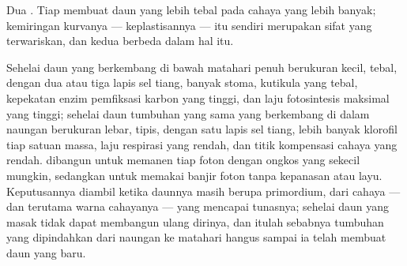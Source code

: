\begin{omfigure}

{\small Dua . Tiap  membuat daun yang lebih tebal
pada cahaya yang lebih banyak; kemiringan kurvanya --- keplastisannya
--- itu sendiri merupakan sifat yang terwariskan, dan kedua 
berbeda dalam hal itu.}
\end{omfigure}

\begin{proposition}\label{prop:b2:plant-plasticity:sunshade}
Sehelai daun yang berkembang di bawah matahari penuh berukuran kecil,
tebal, dengan dua atau tiga lapis sel tiang, banyak stoma, kutikula
yang tebal, kepekatan enzim pemfiksasi karbon yang tinggi, dan laju
fotosintesis maksimal yang tinggi; sehelai daun tumbuhan yang sama yang
berkembang di dalam naungan berukuran lebar, tipis, dengan satu lapis
sel tiang, lebih banyak klorofil tiap satuan massa, laju respirasi yang
rendah, dan titik kompensasi cahaya yang rendah. 
dibangun untuk memanen tiap foton dengan ongkos yang sekecil mungkin,
sedangkan  untuk memakai banjir foton tanpa kepanasan
atau layu. Keputusannya diambil ketika daunnya masih berupa primordium,
dari cahaya --- dan terutama warna cahayanya --- yang mencapai
tunasnya; sehelai daun yang masak tidak dapat membangun ulang dirinya,
dan itulah sebabnya tumbuhan yang dipindahkan dari naungan ke matahari
hangus sampai ia telah membuat daun yang baru.
\end{proposition}

